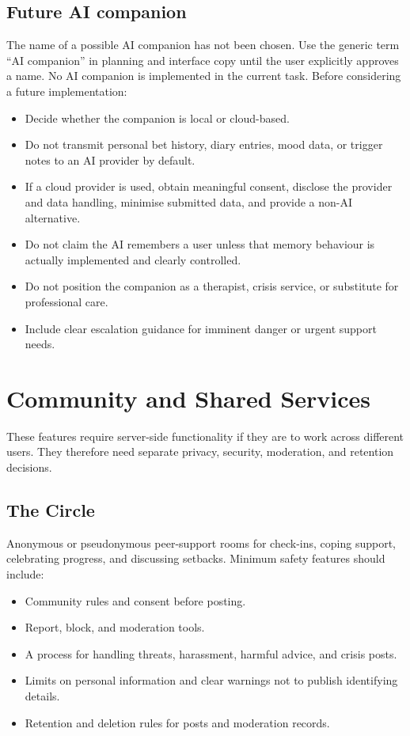 \documentclass[11pt,a4paper]{article}
\begin{document}
\subsection{Future AI companion}
The name of a possible AI companion has not been chosen. Use the generic term ``AI companion'' in planning and interface copy until the user explicitly approves a name. No AI companion is implemented in the current task. Before considering a future implementation:
\begin{itemize}
  \item Decide whether the companion is local or cloud-based.
  \item Do not transmit personal bet history, diary entries, mood data, or trigger notes to an AI provider by default.
  \item If a cloud provider is used, obtain meaningful consent, disclose the provider and data handling, minimise submitted data, and provide a non-AI alternative.
  \item Do not claim the AI remembers a user unless that memory behaviour is actually implemented and clearly controlled.
  \item Do not position the companion as a therapist, crisis service, or substitute for professional care.
  \item Include clear escalation guidance for imminent danger or urgent support needs.
\end{itemize}

\section{Community and Shared Services}

These features require server-side functionality if they are to work across different users. They therefore need separate privacy, security, moderation, and retention decisions.

\subsection{The Circle}
Anonymous or pseudonymous peer-support rooms for check-ins, coping support, celebrating progress, and discussing setbacks. Minimum safety features should include:
\begin{itemize}
  \item Community rules and consent before posting.
  \item Report, block, and moderation tools.
  \item A process for handling threats, harassment, harmful advice, and crisis posts.
  \item Limits on personal information and clear warnings not to publish identifying details.
  \item Retention and deletion rules for posts and moderation records.
\end{itemize}
\end{document}
